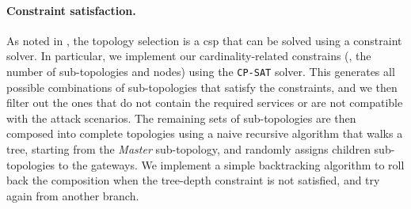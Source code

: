 \paragraph{Constraint satisfaction.}

As noted in , the topology selection is a \gls{csp} that can be solved using a constraint solver.
In particular, we implement our cardinality-related constrains (\ie, the number of sub-topologies and nodes) using the \texttt{CP-SAT} solver.
This generates all possible combinations of sub-topologies that satisfy the constraints, and we then filter out the ones that do not contain the required services or are not compatible with the attack scenarios.
The remaining sets of sub-topologies are then composed into complete topologies using a naive recursive algorithm that walks a tree, starting from the \emph{Master} sub-topology, and randomly assigns children sub-topologies to the gateways.
We implement a simple backtracking algorithm to roll back the composition when the tree-depth constraint is not satisfied, and try again from another branch.